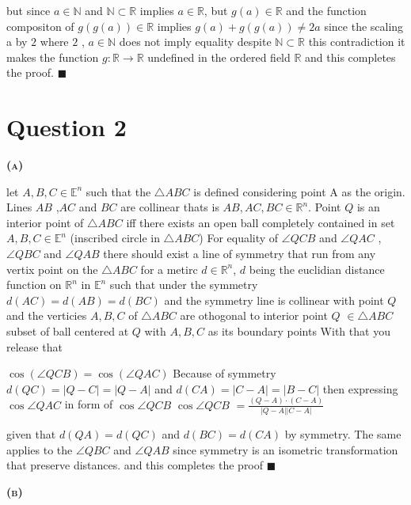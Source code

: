 \documentclass[a4paper, 12pt]{article}
\begin{document}
but since $a \in \mathbb{N}$ and $\mathbb{N} \subset \mathbb{R}$ implies  $a \in \mathbb{R}$,
but $g(a) \in \mathbb{R}$ and the function compositon of $g(g(a)) \in \mathbb{R}$ implies $g(a) + g(g(a))\neq 2a$ \newline
since the scaling a by $2$ where $2$ , $a \in\mathbb{N}$ does not imply equality despite $\mathbb{N} \subset \mathbb{R}$ \newline
this contradiction it makes the function $g:\mathbb{R}\longrightarrow \mathbb{R}$ \newline
undefined in the ordered field $\mathbb{R}$ and this 
completes the proof. $\blacksquare$

\newpage

\section{Question 2 }

\begin{center}
    \fontsize{24pt}{10pt}\selectfont
    \textsc{\textbf{(a)}}
\end{center}

let $A,B,C \in \mathbb{E}^n$ such that the $\triangle ABC$ is defined considering point A as the origin.
Lines $AB$ ,$AC$ and $BC$ are collinear thats is $AB ,AC ,BC \in  \mathbb{R}^n$. Point $Q$ is an interior point of $\triangle ABC$
iff there exists an open ball completely contained in set $A,B,C \in \mathbb{E}^n$ (inscribed circle in $\triangle ABC$)
For equality of $\angle QCB$ and $\angle QAC$ , $\angle QBC$ and  $\angle QAB$ there should exist a line of symmetry that run
from any vertix point on the $\triangle ABC$ for a metirc $d \in \mathbb{R}^n$, $d$ 
being the euclidian distance function on $\mathbb{R}^n$  in   $\mathbb{E}^n$ such that under the symmetry $d(AC) = d(AB) = d(BC)$
and the symmetry line is collinear with point $Q$ and the verticies $A ,B ,C$ of $\triangle ABC$ 
are othogonal to interior point $Q$ $\in \triangle ABC$ subset of ball centered at $Q$ with $A, B, C$ as its boundary points
With that you release that 
\begin{center}
    $\cos (\angle QCB) = \cos (\angle QAC)$ \newline
    Because of symmetry $d(QC) = \left\lvert Q-C \right\rvert = \left\lvert Q-A \right\rvert$ and\newline
    $d(CA) = \left\lvert C-A  \right\rvert = \left\lvert B-C \right\rvert$ then expressing \newline
    $\cos\angle QAC$ in form of $\cos\angle QCB$ \newline
    $\cos\angle QCB$ $ = \frac{(Q-A)\cdot (C-A)}{\left\lvert Q-A \right\rvert \left\lvert C-A \right\rvert }$ \newline
\end{center}
given that $d(QA) = $$d(QC)$ and $d(BC) = $$d(CA)$ by symmetry.
The same applies to the $\angle QBC$ and $\angle QAB$ since symmetry is an isometric transformation that preserve distances.
and this completes the proof $\blacksquare$


\begin{center}
    \fontsize{24pt}{10pt}\selectfont
    \textsc{\textbf{(b)}}
\end{center}
\end{document}
